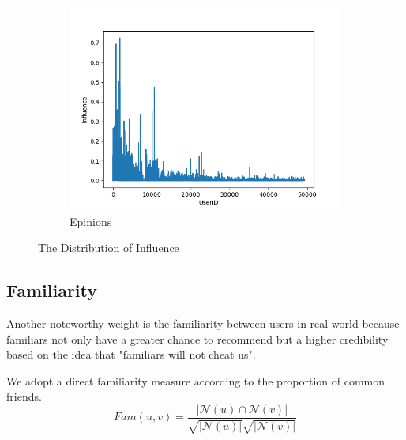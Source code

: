 \documentclass{article}
\begin{document}
\begin{figure}[h]
\begin{subfigure}{0.33\textwidth}
        \includegraphics[width=1\linewidth]{pic/figure4_3.png}
        \caption{Epinions}
    \end{subfigure}
  \caption{The Distribution of Influence}
\end{figure}
\subsection{Familiarity}
Another noteworthy weight is the familiarity between users in real world
because familiars not only have a greater chance to recommend but a higher credibility 
based on the idea that "familiars will not cheat us". 

We adopt a direct familiarity measure \cite{liang2012pr} according to the proportion of common friends.
\begin{equation}
  {Fam}(u, v) = \frac{|\mathcal{N}(u) \cap \mathcal{N}(v)|}{\sqrt{|\mathcal{N}(u)|} \sqrt{|\mathcal{N}(v)|}}
\end{equation}
\end{document}

